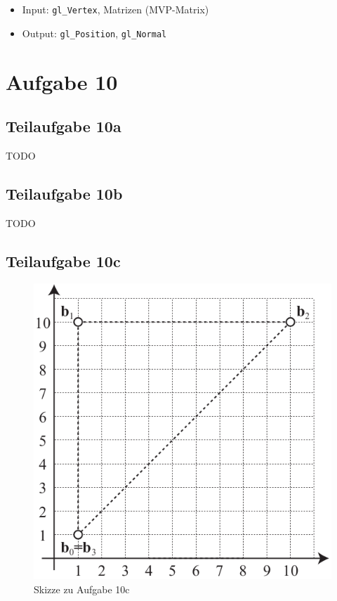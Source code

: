 \documentclass[a4paper]{scrartcl}
\begin{document}
\begin{itemize}
    \item Input: \texttt{gl\_Vertex}, Matrizen (MVP-Matrix)
    \item Output: \texttt{gl\_Position}, \texttt{gl\_Normal}
\end{itemize}


\section*{Aufgabe 10}
\subsection*{Teilaufgabe 10a}
TODO

\subsection*{Teilaufgabe 10b}
TODO

\subsection*{Teilaufgabe 10c}
\begin{figure}[h]
    \centering
    \includegraphics*[width=0.8\linewidth, keepaspectratio]{10c.png}
    \caption{Skizze zu Aufgabe 10c}
    \label{fig:10c}
\end{figure}
\end{document}
